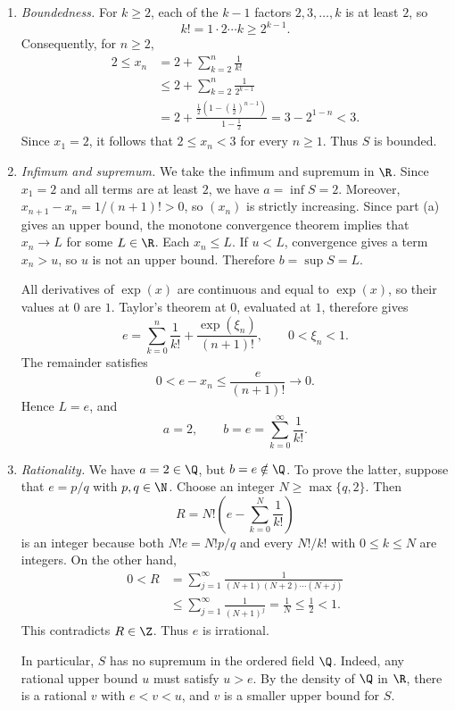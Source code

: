 \leavevmode
\begin{enumerate}
  \item \textit{Boundedness.}
    For $k\geq2$, each of the $k-1$ factors $2,3,\ldots,k$
    is at least $2$, so
    \[
      k!=1\cdot2\cdots k\geq2^{k-1}.
    \]
    Consequently, for $n\geq2$,
    \[
      \begin{aligned}
        2\leq x_n
          &=2+\sum_{k=2}^n\frac1{k!}\\
          &\leq2+\sum_{k=2}^n\frac1{2^{k-1}}\\
          &=2+\frac{\tfrac12(1-(\tfrac12)^{n-1})}{1-\tfrac12}
          =3-2^{1-n}<3.
      \end{aligned}
    \]
    Since $x_1=2$, it follows that $2\leq x_n<3$ for every
    $n\geq1$. Thus $S$ is bounded.

  \item \textit{Infimum and supremum.}
    We take the infimum and supremum in $\R$. Since $x_1=2$
    and all terms are at least $2$, we have $a=\inf S=2$.
    Moreover, $x_{n+1}-x_n=1/(n+1)!>0$, so $(x_n)$ is strictly
    increasing. Since part (a) gives an
    upper bound, the monotone convergence theorem implies that
    $x_n\to L$ for some $L\in\R$.
    Each $x_n\leq L$. If $u<L$, convergence gives a term $x_n>u$,
    so $u$ is not an upper bound. Therefore $b=\sup S=L$.

    All derivatives of $\exp(x)$ are continuous and equal to
    $\exp(x)$, so their values at $0$ are $1$.
    Taylor's theorem at $0$, evaluated at $1$, therefore
    gives
    \[
      e=\sum_{k=0}^n\frac1{k!}
        +\frac{\exp(\xi_n)}{(n+1)!},\qquad 0<\xi_n<1.
    \]
    The remainder satisfies
    \[
      0<e-x_n\leq\frac{e}{(n+1)!}\longrightarrow0.
    \]
    Hence $L=e$, and
    \[
      a=2,\qquad b=e=\sum_{k=0}^{\infty}\frac1{k!}.
    \]

  \item \textit{Rationality.}
    We have $a=2\in\Q$, but $b=e\notin\Q$. To prove the latter,
    suppose that $e=p/q$ with $p,q\in\N$. Choose an integer
    $N\geq\max\{q,2\}$. Then
    \[
      R=N!\left(e-\sum_{k=0}^N\frac1{k!}\right)
    \]
    is an integer because both $N!e=N!p/q$ and every $N!/k!$ with
    $0\leq k\leq N$ are integers. On the other hand,
    \[
      \begin{aligned}
        0<R
          &=\sum_{j=1}^{\infty}
            \frac1{(N+1)(N+2)\cdots(N+j)}\\
          &\leq\sum_{j=1}^{\infty}\frac1{(N+1)^j}
          =\frac1N\leq\frac12<1.
      \end{aligned}
    \]
    This contradicts $R\in\Z$. Thus $e$ is irrational.

    In particular, $S$ has no supremum in the ordered field $\Q$.
    Indeed, any rational upper bound $u$ must satisfy $u>e$.
    By the density of $\Q$ in $\R$, there is a rational $v$
    with $e<v<u$, and $v$ is a smaller upper bound for $S$.
\end{enumerate}
